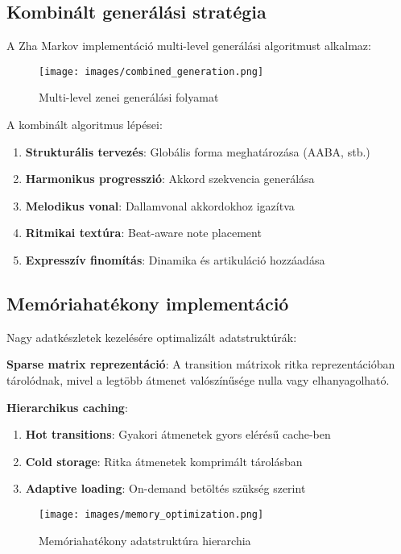 \subsection{Kombinált generálási stratégia}
A Zha Markov implementáció multi-level generálási algoritmust alkalmaz:

\begin{figure}[h]
\centering
\texttt{[image: images/combined\_generation.png]}
\caption{Multi-level zenei generálási folyamat}
\label{fig:combined_gen}
\end{figure}

A kombinált algoritmus lépései:
\begin{enumerate}
\item \textbf{Strukturális tervezés}: Globális forma meghatározása (AABA, stb.)
\item \textbf{Harmonikus progresszió}: Akkord szekvencia generálása
\item \textbf{Melodikus vonal}: Dallamvonal akkordokhoz igazítva
\item \textbf{Ritmikai textúra}: Beat-aware note placement
\item \textbf{Expresszív finomítás}: Dinamika és artikuláció hozzáadása
\end{enumerate}

\subsection{Memóriahatékony implementáció}
Nagy adatkészletek kezelésére optimalizált adatstruktúrák:

\textbf{Sparse matrix reprezentáció}:
A transition mátrixok ritka reprezentációban tárolódnak, mivel a legtöbb átmenet valószínűsége nulla vagy elhanyagolható.

\textbf{Hierarchikus caching}:
\begin{enumerate}
\item \textbf{Hot transitions}: Gyakori átmenetek gyors elérésű cache-ben
\item \textbf{Cold storage}: Ritka átmenetek komprimált tárolásban
\item \textbf{Adaptive loading}: On-demand betöltés szükség szerint
\end{enumerate}

\begin{figure}[h]
\centering
\texttt{[image: images/memory\_optimization.png]}
\caption{Memóriahatékony adatstruktúra hierarchia}
\label{fig:memory_opt}
\end{figure}

